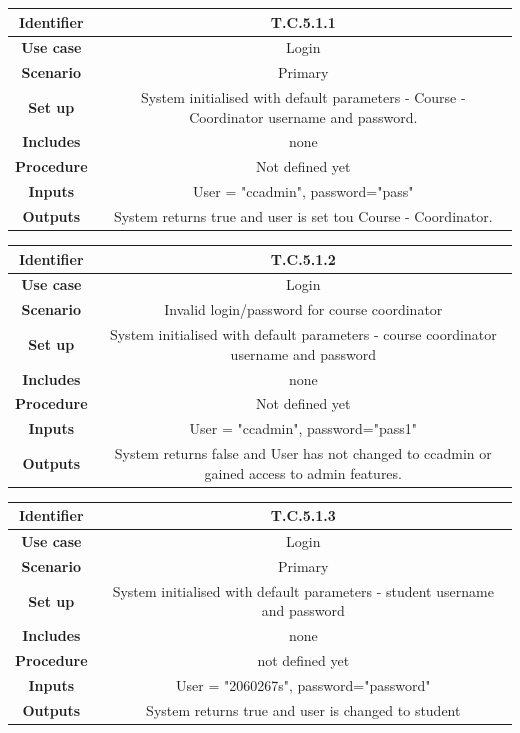 \documentclass{l3deliverable}
\begin{document}
\begin{tabular}{|c|c|}
\hline \textbf{Identifier} & T.C.5.1.1\\
\hline \textbf{Use case} & Login \\
\hline \textbf{Scenario} & Primary \\
\hline \textbf{Set up} & System initialised with default parameters - Course - Coordinator username and password.\\
\hline \textbf{Includes} & none\\
\hline \textbf{Procedure} & Not defined yet\\
\hline \textbf{Inputs} & User = "ccadmin", password="pass"\\
\hline \textbf{Outputs} & System returns true and user is set tou Course - Coordinator.\\
\hline
\end{tabular}

\begin{tabular}{|c|c|}
\hline \textbf{Identifier} & T.C.5.1.2 \\
\hline \textbf{Use case} & Login\\
\hline \textbf{Scenario} & Invalid login/password for course coordinator\\
\hline \textbf{Set up} & System initialised with default parameters - course coordinator username and password\\
\hline \textbf{Includes} & none\\
\hline \textbf{Procedure} & Not defined yet\\
\hline \textbf{Inputs} & User = "ccadmin", password="pass1"\\
\hline \textbf{Outputs} & System returns false and User has not changed to ccadmin or gained access to admin features.\\
\hline
\end{tabular}

\begin{tabular}{|c|c|}
\hline \textbf{Identifier} & T.C.5.1.3\\
\hline \textbf{Use case} & Login \\
\hline \textbf{Scenario} & Primary\\
\hline \textbf{Set up} & System initialised with default parameters - student username and password\\
\hline \textbf{Includes} & none\\
\hline \textbf{Procedure} & not defined yet\\
\hline \textbf{Inputs} & User = "2060267s", password="password"\\
\hline \textbf{Outputs} & System returns true and user is changed to student\\
\hline
\end{tabular}
\end{document}
